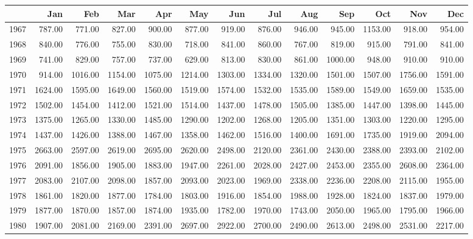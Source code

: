 \begin{longtable}{rrrrrrrrrrrrr}
  \hline
 & Jan & Feb & Mar & Apr & May & Jun & Jul & Aug & Sep & Oct & Nov & Dec \\ 
  \hline
1967 & 787.00 & 771.00 & 827.00 & 900.00 & 877.00 & 919.00 & 876.00 & 946.00 & 945.00 & 1153.00 & 918.00 & 954.00 \\ 
  1968 & 840.00 & 776.00 & 755.00 & 830.00 & 718.00 & 841.00 & 860.00 & 767.00 & 819.00 & 915.00 & 791.00 & 841.00 \\ 
  1969 & 741.00 & 829.00 & 757.00 & 737.00 & 629.00 & 813.00 & 830.00 & 861.00 & 1000.00 & 948.00 & 910.00 & 910.00 \\ 
  1970 & 914.00 & 1016.00 & 1154.00 & 1075.00 & 1214.00 & 1303.00 & 1334.00 & 1320.00 & 1501.00 & 1507.00 & 1756.00 & 1591.00 \\ 
  1971 & 1624.00 & 1595.00 & 1649.00 & 1560.00 & 1519.00 & 1574.00 & 1532.00 & 1535.00 & 1589.00 & 1549.00 & 1659.00 & 1535.00 \\ 
  1972 & 1502.00 & 1454.00 & 1412.00 & 1521.00 & 1514.00 & 1437.00 & 1478.00 & 1505.00 & 1385.00 & 1447.00 & 1398.00 & 1445.00 \\ 
  1973 & 1375.00 & 1265.00 & 1330.00 & 1485.00 & 1290.00 & 1202.00 & 1268.00 & 1205.00 & 1351.00 & 1303.00 & 1220.00 & 1295.00 \\ 
  1974 & 1437.00 & 1426.00 & 1388.00 & 1467.00 & 1358.00 & 1462.00 & 1516.00 & 1400.00 & 1691.00 & 1735.00 & 1919.00 & 2094.00 \\ 
  1975 & 2663.00 & 2597.00 & 2619.00 & 2695.00 & 2620.00 & 2498.00 & 2120.00 & 2361.00 & 2430.00 & 2388.00 & 2393.00 & 2102.00 \\ 
  1976 & 2091.00 & 1856.00 & 1905.00 & 1883.00 & 1947.00 & 2261.00 & 2028.00 & 2427.00 & 2453.00 & 2355.00 & 2608.00 & 2364.00 \\ 
  1977 & 2083.00 & 2107.00 & 2098.00 & 1857.00 & 2093.00 & 2023.00 & 1969.00 & 2338.00 & 2236.00 & 2208.00 & 2115.00 & 1955.00 \\ 
  1978 & 1861.00 & 1820.00 & 1877.00 & 1784.00 & 1803.00 & 1916.00 & 1854.00 & 1988.00 & 1928.00 & 1824.00 & 1837.00 & 1979.00 \\ 
  1979 & 1877.00 & 1870.00 & 1857.00 & 1874.00 & 1935.00 & 1782.00 & 1970.00 & 1743.00 & 2050.00 & 1965.00 & 1795.00 & 1966.00 \\ 
  1980 & 1907.00 & 2081.00 & 2169.00 & 2391.00 & 2697.00 & 2922.00 & 2700.00 & 2490.00 & 2613.00 & 2498.00 & 2531.00 & 2217.00 \\ 

\end{longtable}
